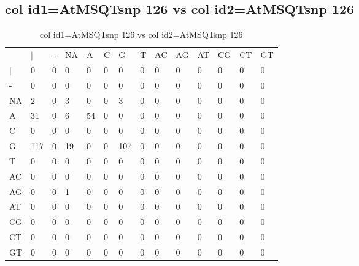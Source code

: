 \subsection{col id1=AtMSQTsnp 126 vs col id2=AtMSQTsnp 126}
\begin{center}
\begin{longtable}{|l|l|l|l|l|l|l|l|l|l|l|l|l|l|}
\caption{col id1=AtMSQTsnp 126 vs col id2=AtMSQTsnp 126} \label{table_dm708}\\
\hline
\\
\hline
&$|$&-&NA&A&C&G&T&AC&AG&AT&CG&CT&GT\\
$|$&0&0&0&0&0&0&0&0&0&0&0&0&0\\
-&0&0&0&0&0&0&0&0&0&0&0&0&0\\
NA&2&0&3&0&0&3&0&0&0&0&0&0&0\\
A&31&0&6&54&0&0&0&0&0&0&0&0&0\\
C&0&0&0&0&0&0&0&0&0&0&0&0&0\\
G&117&0&19&0&0&107&0&0&0&0&0&0&0\\
T&0&0&0&0&0&0&0&0&0&0&0&0&0\\
AC&0&0&0&0&0&0&0&0&0&0&0&0&0\\
AG&0&0&1&0&0&0&0&0&0&0&0&0&0\\
AT&0&0&0&0&0&0&0&0&0&0&0&0&0\\
CG&0&0&0&0&0&0&0&0&0&0&0&0&0\\
CT&0&0&0&0&0&0&0&0&0&0&0&0&0\\
GT&0&0&0&0&0&0&0&0&0&0&0&0&0\\
\hline
\end{longtable}
\end{center}

